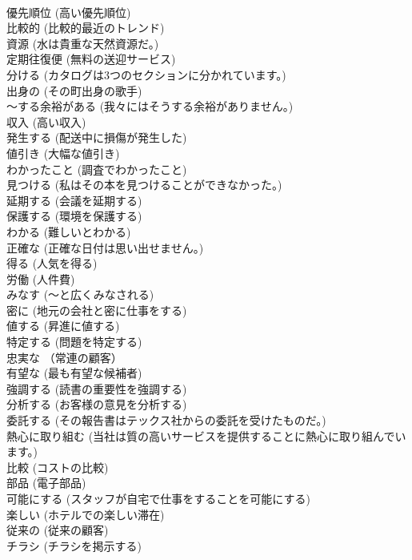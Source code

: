 \documentclass[8pt]{extreport}
\begin{document}
\begin{CJK}{UTF8}{min}
\\	優先順位	(高い優先順位)		
\\	比較的	(比較的最近のトレンド)		
\\	資源	(水は貴重な天然資源だ。)		
\\	定期往復便	(無料の送迎サービス)		
\\	分ける	(カタログは3つのセクションに分かれています。)		
\\	出身の	(その町出身の歌手)		
\\	～する余裕がある	(我々にはそうする余裕がありません。)		
\\	収入	(高い収入)		
\\	発生する	(配送中に損傷が発生した)		
\\	値引き	(大幅な値引き)		
\\	わかったこと	(調査でわかったこと)		
\\	見つける	(私はその本を見つけることができなかった。)		
\\	延期する	(会議を延期する)		
\\	保護する	(環境を保護する)		
\\	わかる	(難しいとわかる)		
\\	正確な	(正確な日付は思い出せません。)		
\\	得る	(人気を得る)		
\\	労働	(人件費)		
\\	みなす	(～と広くみなされる)		
\\	密に	(地元の会社と密に仕事をする)		
\\	値する	(昇進に値する)		
\\	特定する	(問題を特定する)		
\\	忠実な	（常連の顧客）		
\\	有望な	(最も有望な候補者)		
\\	強調する	(読書の重要性を強調する)		
\\	分析する	(お客様の意見を分析する)		
\\	委託する	(その報告書はテックス社からの委託を受けたものだ。)		
\\	熱心に取り組む	(当社は質の高いサービスを提供することに熱心に取り組んでいます。)		
\\	比較	(コストの比較)		
\\	部品	(電子部品)		
\\	可能にする	(スタッフが自宅で仕事をすることを可能にする)		
\\	楽しい	(ホテルでの楽しい滞在)		
\\	従来の	(従来の顧客)		
\\	チラシ	(チラシを掲示する)		

\end{CJK}
\end{document}

